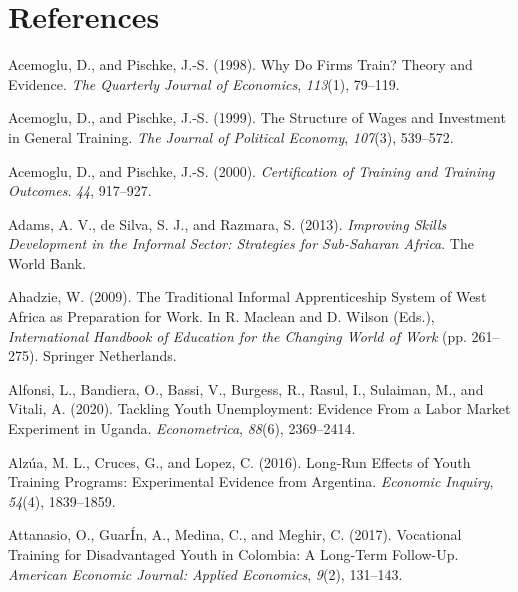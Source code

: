 \documentclass[
  11pt,
a4paper
]{report}
\newlength{\cslhangindent}
\newenvironment{CSLReferences}[2] %
 {%
  \setlength{\parindent}{0pt}
  \ifodd #1 \everypar{\setlength{\hangindent}{\cslhangindent}}\ignorespaces\fi
  \ifnum #2 > 0
  \setlength{\parskip}{#2\baselineskip}
  \fi
 }%
 {}
\begin{document}
\clearpage

\hypertarget{references}{%
\section*{References}\label{references}}

\noindent

\hypertarget{refs}{}
\begin{CSLReferences}{1}{0}
\leavevmode{}%
Acemoglu, D., and Pischke, J.-S. (1998). Why {Do Firms Train}? {Theory} and {Evidence}. \emph{The Quarterly Journal of Economics}, \emph{113}(1), 79--119.

\leavevmode{}%
Acemoglu, D., and Pischke, J.-S. (1999). The {Structure} of {Wages} and {Investment} in {General Training}. \emph{The Journal of Political Economy}, \emph{107}(3), 539--572.

\leavevmode{}%
Acemoglu, D., and Pischke, J.-S. (2000). \emph{Certification of {Training} and {Training Outcomes}}. \emph{44}, 917--927.

\leavevmode{}%
Adams, A. V., de Silva, S. J., and Razmara, S. (2013). \emph{Improving {Skills Development} in the {Informal Sector}: {Strategies} for {Sub-Saharan Africa}}. {The World Bank}.

\leavevmode{}%
Ahadzie, W. (2009). The {Traditional Informal Apprenticeship System} of {West Africa} as {Preparation} for {Work}. In R. Maclean and D. Wilson (Eds.), \emph{International {Handbook} of {Education} for the {Changing World} of {Work}} (pp. 261--275). {Springer Netherlands}.

\leavevmode{}%
Alfonsi, L., Bandiera, O., Bassi, V., Burgess, R., Rasul, I., Sulaiman, M., and Vitali, A. (2020). Tackling {Youth Unemployment}: {Evidence From} a {Labor Market Experiment} in {Uganda}. \emph{Econometrica}, \emph{88}(6), 2369--2414.

\leavevmode{}%
Alzúa, M. L., Cruces, G., and Lopez, C. (2016). Long-{Run Effects} of {Youth Training Programs}: {Experimental Evidence} from {Argentina}. \emph{Economic Inquiry}, \emph{54}(4), 1839--1859.

\leavevmode{}%
Attanasio, O., GuarÍn, A., Medina, C., and Meghir, C. (2017). Vocational {Training} for {Disadvantaged Youth} in {Colombia}: {A Long-Term Follow-Up}. \emph{American Economic Journal: Applied Economics}, \emph{9}(2), 131--143.


\end{CSLReferences}
\end{document}
